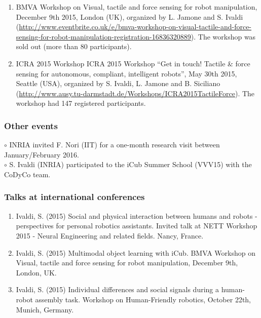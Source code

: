\begin{enumerate}
\item  BMVA Workshop on Visual, tactile and force sensing for robot manipulation, December 9th 2015, London (UK), organized by L. Jamone and S. Ivaldi  (\url{http://www.eventbrite.co.uk/e/bmva-workshop-on-visual-tactile-and-force-sensing-for-robot-manipulation-registration-16836320889}). The workshop was sold out (more than 80 participants).

\item ICRA 2015 Workshop ICRA 2015 Workshop ``Get in touch! Tactile \& force sensing for autonomous, compliant, intelligent robots'', May 30th 2015, Seattle (USA), organized by S. Ivaldi, L. Jamone and B. Siciliano (\url{http://www.ausy.tu-darmstadt.de/Workshops/ICRA2015TactileForce}). The workshop had 147 registered participants.
\end{enumerate}



\subsubsection{Other events}

$\circ$ INRIA invited F. Nori (IIT) for a one-month research visit between January/February 2016. \\
$\circ$ S. Ivaldi (INRIA) participated to the iCub Summer School (VVV15) with the CoDyCo team. 
%
%
%
%


\subsubsection{Talks at international conferences}

\begin{enumerate}
\item  Ivaldi, S. (2015) Social and physical interaction between humans and robots - perspectives for personal robotics assistants. Invited talk at NETT Workshop 2015 - Neural Engineering and related fields. Nancy, France.

\item Ivaldi, S. (2015) Multimodal object learning with iCub. BMVA Workshop on Visual, tactile and force sensing for robot manipulation, December 9th, London, UK.

\item Ivaldi, S. (2015) Individual differences and social signals during a human-robot assembly task. Workshop on Human-Friendly robotics, October 22th, Munich, Germany.
\end{enumerate}






